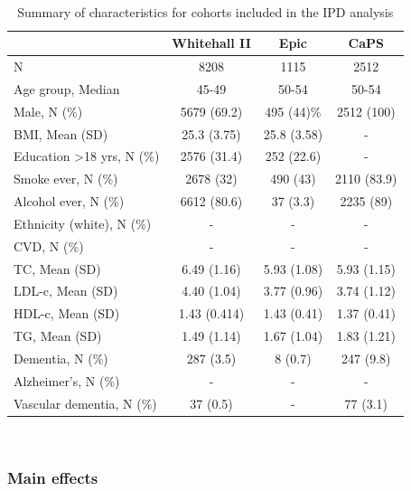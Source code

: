 \documentclass[a4paper, twoside]{templates/ociamthesis}
\begin{document}
~





\begin{table}[H]

\caption[Summary of characteristics of IPD cohorts]{\label{tab:covariateSummary-table}Summary of characteristics for cohorts included in the IPD analysis}
\centering
\begin{tabular}[t]{>{}lccc}
\toprule
\textbf{ } & \textbf{Whitehall II} & \textbf{Epic} & \textbf{CaPS}\\
\midrule
N & 8208 & 1115 & 2512\\
\midrule
Age group, Median & 45-49 & 50-54 & 50-54\\
\midrule
Male, N (\%) & 5679 (69.2) & 495 (44)\% & 2512 (100)\\
\midrule
BMI, Mean (SD) & 25.3 (3.75) & 25.8 (3.58) & -\\
\midrule
Education >18 yrs, N (\%) & 2576 (31.4) & 252 (22.6) & -\\
\midrule
\addlinespace
Smoke ever, N (\%) & 2678 (32) & 490 (43) & 2110 (83.9)\\
\midrule
Alcohol ever, N (\%) & 6612 (80.6) & 37 (3.3) & 2235 (89)\\
\midrule
Ethnicity (white), N (\%) & - & - & -\\
\midrule
CVD, N (\%) & - & - & -\\
\midrule
TC, Mean (SD) & 6.49 (1.16) & 5.93 (1.08) & 5.93 (1.15)\\
\midrule
\addlinespace
LDL-c, Mean (SD) & 4.40 (1.04) & 3.77 (0.96) & 3.74 (1.12)\\
\midrule
HDL-c, Mean (SD) & 1.43 (0.414) & 1.43 (0.41) & 1.37 (0.41)\\
\midrule
TG, Mean (SD) & 1.49 (1.14) & 1.67 (1.04) & 1.83 (1.21)\\
\midrule
Dementia, N (\%) & 287 (3.5) & 8 (0.7) & 247 (9.8)\\
\midrule
Alzheimer's, N (\%) & - & - & -\\
\midrule
\addlinespace
Vascular dementia, N (\%) & 37 (0.5) & - & 77 (3.1)\\
\bottomrule
\end{tabular}
\end{table}

~

\hypertarget{main-effects}{%
\subsubsection{Main effects}\label{main-effects}}
\end{document}
